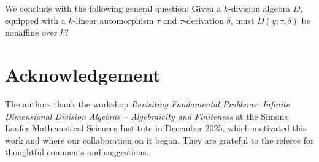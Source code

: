 \documentclass{conm-p-l}
\theoremstyle{definition}
\theoremstyle{remark}
\numberwithin{equation}{section}
\begin{document}
We conclude with the following general question: Given a $k$-division algebra $D$, equipped with a $k$-linear automorphism $\tau$ and $\tau$-derivation $\delta$, must $D(y;\tau,\delta)$ be nonaffine over $k$? 

\section*{Acknowledgement}  The authors thank the workshop \emph{Revisiting Fundamental Problems: Infinite Dimensional Division Algebras -- Algebraicity and Finiteness} at the Simons Laufer Mathematical Sciences Institute in December 2025, which motivated this work and where our collaboration on it began. They are grateful to the referee for thoughtful comments and suggestions.


\end{document}
